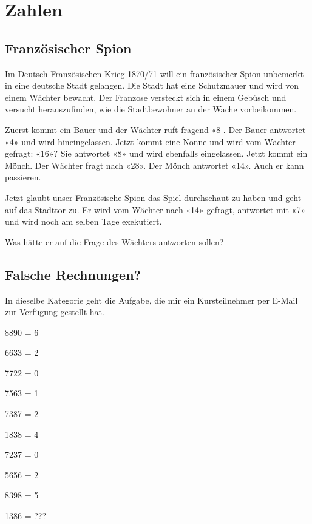 \section{Zahlen}  
\subsection{Französischer Spion}
Im Deutsch-Französischen Krieg 1870/71 will ein französischer Spion
unbemerkt in eine deutsche Stadt gelangen. Die Stadt hat eine Schutzmauer
und wird von einem Wächter bewacht. Der Franzose versteckt sich in einem
Gebüsch und versucht herauszufinden, wie die Stadtbewohner an der Wache
vorbeikommen.

Zuerst kommt ein Bauer und der Wächter ruft fragend «8 . Der Bauer antwortet
«4» und wird hineingelassen. Jetzt kommt eine Nonne und wird vom Wächter
gefragt: «16»? Sie antwortet «8» und wird ebenfalls eingelassen. Jetzt kommt ein
Mönch. Der Wächter fragt nach «28». Der Mönch antwortet «14». Auch er kann
passieren.

Jetzt glaubt unser Französische Spion das Spiel durchschaut zu haben und geht
auf das Stadttor zu. Er wird vom Wächter nach «14» gefragt, antwortet mit «7»
und wird noch am selben Tage exekutiert.

Was hätte er auf die Frage des Wächters antworten sollen?

\subsection{Falsche Rechnungen?}
In dieselbe Kategorie geht die Aufgabe, die mir ein Kursteilnehmer per E-Mail
zur Verfügung gestellt hat.

8890 = 6

6633 = 2

7722 = 0 

7563 = 1

7387 = 2

1838 = 4

7237 = 0
 
5656 = 2

8398 = 5

1386 = ???

\TNTeop{}

